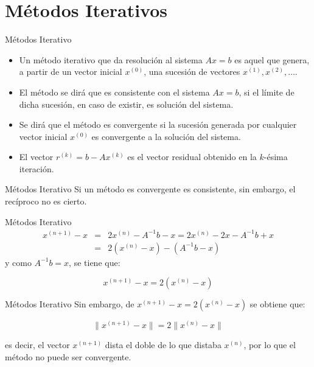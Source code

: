 \documentclass{beamer}
\begin{document}
  \section{M\'etodos Iterativos}
  \begin{frame}{M\'etodos Iterativo}
  \begin{itemize}
  \item<1-> Un m\'etodo iterativo que da resoluci\'on al sistema $Ax = b$ es aquel que genera, a partir de un vector inicial $x^{(0)}$, una sucesi\'on de vectores $x^{(1)},x^{(2)}, \ldots$.
  \item<2-> El m\'etodo se dir\'a que es consistente con el sistema $Ax = b$, si el l\'imite de dicha sucesi\'on, en caso de existir, es
  soluci\'on del sistema.
  \item<3-> Se dir\'a que el m\'etodo es convergente si la sucesi\'on generada por cualquier vector inicial $x^{(0)}$ es convergente a la soluci\'on del sistema.
  \item<4-> El vector $r^{(k)} = b-Ax^{(k)}$ es el vector residual obtenido en la $k$-\'esima iteraci\'on.
  \end{itemize}
  \end{frame}
  \begin{frame}{M\'etodos Iterativo}
  Si un m\'etodo es convergente es consistente, sin embargo, el rec\'iproco no es cierto.
  \end{frame}
  \begin{frame}{M\'etodos Iterativo}
  \begin{eqnarray}
  x^{(n+1)}-x & = & 2x^{(n)}-A^{-1}b-x = 2x^{(n)}-2x-A^{-1}b+x \nonumber\\
  & = & 2(x^{(n)}-x)-(A^{-1}b-x)\nonumber
  \end{eqnarray}
  y como $A^{-1}b = x$, se tiene que:
  \begin{block}{}
  $$
  x^{(n+1)}-x = 2(x^{(n)}-x)
  $$
  \end{block}
  \end{frame}
  \begin{frame}{M\'etodos Iterativo}
  Sin embargo, de $x^{(n+1)} - x = 2(x^{(n)} - x)$ se obtiene que:
  \begin{block}{}
  $$
  \|x^{(n+1)}-x\| = 2\|x^{(n)}-x\|
  $$
  \end{block}
  es decir, el vector $x^{(n+1)}$ dista el doble de lo que distaba $x^{(n)}$, por lo que el m\'etodo no puede ser convergente.
  \end{frame}  
\end{document}

